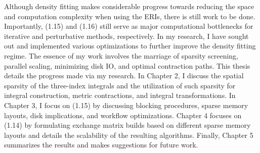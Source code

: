 Although density fitting makes considerable progress towards reducing the space and computation complexity when
using the ERIs, there is still work to be done. Importantly, (1.15) and (1.16) still serve as major computational
bottlenecks for iterative and perturbative methods, respectively. In my research, I have sought out and implemented various 
optimizations to further improve the density fitting regime. The essence of my work involves the marriage of sparsity screening,
parallel scaling, minimizing disk IO, and optimal contraction paths. This thesis details the progress made via my research.
In Chapter 2, I discuss the spatial sparsity of the three-index integrals and the utilization of such sparsity for integral 
construction, metric contractions, and integral transformations.
In Chapter 3, I focus on (1.15) by discussing blocking procedures, sparse memory layouts, disk implications,
and workflow optimizations.
Chapter 4 focuses on (1.14) by formulating exchange matrix builds based on different sparse memory layouts and details 
the scalability of the resulting algorithms.
Finally, Chapter 5 summarizes the results and makes suggestions for future work.




